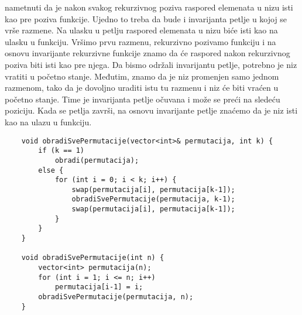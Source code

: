 \documentclass{article}
\begin{document}
nametnuti da je nakon svakog rekurzivnog poziva raspored elemenata u nizu isti
kao pre poziva funkcije. Ujedno to treba da bude i invarijanta petlje u kojoj
se vrše razmene. Na ulasku u petlju raspored elemenata u nizu biće isti kao
na ulasku u funkciju. Vršimo prvu razmenu, rekurzivno pozivamo funkciju i na
osnovu invarijante rekurzivne funkcije znamo da će raspored nakon rekurzivnog poziva biti isti kao pre njega. Da bismo održali invarijantu petlje, potrebno je
niz vratiti u početno stanje. Međutim, znamo da je niz promenjen samo jednom
razmenom, tako da je dovoljno uraditi istu tu razmenu i niz će biti vraćen u
početno stanje. Time je invarijanta petlje očuvana i može se preći na sledeću
poziciju. Kada se petlja završi, na osnovu invarijante petlje znaćemo da je niz
isti kao na ulazu u funkciju.
\begin{lstlisting}
    void obradiSvePermutacije(vector<int>& permutacija, int k) {
        if (k == 1)
            obradi(permutacija);
        else {
            for (int i = 0; i < k; i++) {
                swap(permutacija[i], permutacija[k-1]);
                obradiSvePermutacije(permutacija, k-1);
                swap(permutacija[i], permutacija[k-1]);
            }
        }
    }
    
    void obradiSvePermutacije(int n) {
        vector<int> permutacija(n);
        for (int i = 1; i <= n; i++)
            permutacija[i-1] = i;
        obradiSvePermutacije(permutacija, n);
    }
\end{lstlisting}
\end{document}

